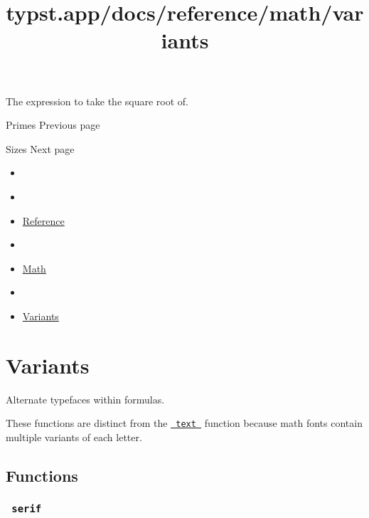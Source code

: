 The expression to take the square root of.

\href{/docs/reference/math/primes/}{\pandocbounded{}}

{ Primes } { Previous page }

\href{/docs/reference/math/sizes/}{\pandocbounded{}}

{ Sizes } { Next page }


\title{typst.app/docs/reference/math/variants}

\begin{itemize}
\tightlist
\item
  \href{/docs}{}
\item
  
\item
  \href{/docs/reference/}{Reference}
\item
  
\item
  \href{/docs/reference/math/}{Math}
\item
  
\item
  \href{/docs/reference/math/variants}{Variants}
\end{itemize}

\section{Variants}\label{summary}

Alternate typefaces within formulas.

These functions are distinct from the
\href{/docs/reference/text/text/}{\texttt{\ text\ }} function because
math fonts contain multiple variants of each letter.

\subsection{Functions}\label{functions}

\subsubsection{\texorpdfstring{\texttt{\ serif\ }}{ serif }}\label{functions-serif}

